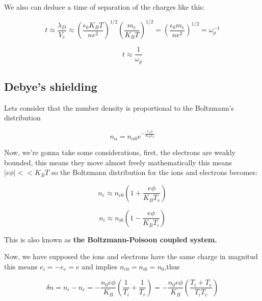 \documentclass[spanish,notitlepage,letterpaper,11pt]{article} %
\numberwithin{equation}{subsection}
\begin{document}
        We also can deduce a time of separation of the charges like this:

        \begin{equation*}
            t \approx \frac{\lambda_D}{V_e} \approx \left(\frac{\epsilon_0K_BT}{ne^2}\right)^{1/2}\left(\frac{m_e}{K_BT}\right)^{1/2} = \left(\frac{\epsilon_0m_e}{ne^2}\right)^{1/2} = \omega_p^{-1}
        \end{equation*}

        \begin{equation}
            t \approx \frac{1}{\omega_p}
        \end{equation}

    \subsection{Debye's shielding}
        Lets consider that the number density is proportional to the Boltzmann's distribution

        \begin{equation}
            n_{\alpha} = n_{\alpha 0}e^{-\frac{e_{\alpha}\phi}{K_BT_{\alpha}}}
        \end{equation}

        Now, we're gonna take some considerations, first, the electrons are weakly bounded, this means they move almost freely mathematically this means $|e\phi| << K_BT$ so the Boltzmann distribution for the ions and electrons becomes:

        \begin{equation}
            n_e \approx n_{e0}\left(1 + \frac{e\phi}{K_BT_e}\right)
        \end{equation}

        \begin{equation}
            n_i \approx n_{i0}\left(1 - \frac{e\phi}{K_BT_i}\right)
        \end{equation}

        This is also known as \textbf{the Boltzmann-Poisoon coupled system.}

        Now, we have supposed the ions and electrons have the same charge in magnitud this means $e_i = -e_e = e$ and implies $n_{e0} = n_{i0} = n_0$,thus

        \begin{equation*}
            \delta n = n_i - n_e = -\frac{n_0e\phi}{K_B}\left(\frac{1}{T_i} + \frac{1}{T_r}\right) = -\frac{n_0e\phi}{K_B}\left(\frac{T_i+T_e}{T_iT_e}\right)
        \end{equation*}
\end{document}

